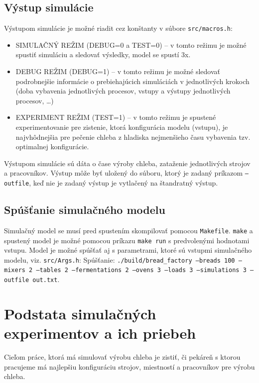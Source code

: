 \documentclass[a4paper, 10pt]{article}
\begin{document}
    \subsection{Výstup simulácie}
    Výstupom simulácie je možné riadit cez konštanty v súbore \texttt{src/macros.h}:
    \begin{itemize}
        \item SIMULAČNÝ REŽIM (DEBUG=0 a TEST=0) -- v tomto režimu je možné spustiť simuláciu a sledovať výsledky, model se spustí 3x.
        \item DEBUG REŽIM (DEBUG=1) -- v tomto režimu je možné sledovať podrobnejšie informácie o prebiehajúcich simuláciách
        v jednotlivých krokoch (doba vybavenia jednotlivých procesov, vstupy a výstupy jednotlivých procesov, \ldots)
        \item EXPERIMENT REŽIM (TEST=1) -- v tomto režimu je spustené experimentovanie pre zistenie,
        ktorá konfigurácia modelu (vstupu), je najvhôdnejšia pre pečenie
        chleba z hladiska nejmenšieho času vybavenia tzv. optimalnej konfigurácie.
    \end{itemize}

    Výstupom simulácie sú dáta o čase výroby chleba, zataženie jednotlivých strojov a pracovníkov.
    Výstup môže byť uložený do súboru, ktorý je zadaný príkazom \texttt{--outfile}, keď nie je zadaný
    výstup je vytlačený na štandratný výstup.

    \subsection{Spúšťanie simulačného modelu}\label{subsec:spousteni-simulacniho-model}
    Simulačný model se musí pred spustením skompilovať pomocou \texttt{Makefile}.
    \texttt{make} a spustený model je možné pomocou príkazu \texttt{make run} s predvolenými hodnotami vstupu.
    Model je možné spúšťať aj s parametrami, ktoré sú vstupmi simulačného modelu, viz. \texttt{src/Args.h}:
    Spúšťanie: \texttt{./build/bread\_factory --breads 100 --mixers 2 --tables 2
    --fermentations 2 --ovens 3 --loads 3 --simulations 3 --outfile out.txt}.


    \section{Podstata simulačných experimentov a ich priebeh}
    Cieľom práce, ktorá má simulovať výrobu chleba je zistiť, či pekáreň s ktorou pracujeme má najlepšiu konfiguráciu
    strojov, miestností a pracovníkov pre výrobu chleba.
\end{document}
